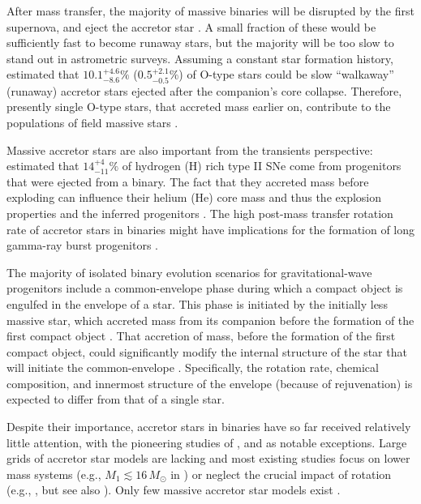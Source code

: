 \documentclass[twocolumn,twocolappendix,trackchanges]{aastex63}
\begin{document}
After mass transfer, the majority of massive binaries will be
disrupted by the first supernova, and eject the accretor star \citep[``binary SN
scenario'', ][]{blaauw:61, dedonder:97, eldridge:11, boubert:18,
  renzo:19walk, evans:20}.  A small fraction of these would be
sufficiently fast to become runaway stars, but the majority will be
too slow to stand out in astrometric surveys. Assuming a constant star
formation history, \cite{renzo:19walk} estimated that
$10.1^{+4.6}_{-8.6}\%$ ($0.5^{+2.1}_{-0.5}\%$) of O-type stars could
be slow ``walkaway'' (runaway) accretor stars ejected after the companion's
core collapse. Therefore, presently single O-type stars, that accreted
mass earlier on, contribute to the populations of field massive stars \citep[e.g.,][]{dorigo-jones:20}.

Massive accretor stars are also
important from the transients perspective: \cite{zapartas:19} estimated that $14_{-11}^{+4}\%$ of
hydrogen (H) rich
type II SNe come from progenitors that were ejected from a binary. The fact that they accreted mass before exploding can
influence their helium (He) core mass and thus the explosion
properties and the inferred progenitors \citep{zapartas:21}. %
The high post-mass transfer rotation
rate of accretor stars in binaries might have implications for the
formation of long gamma-ray burst progenitors \citep[e.g.,][]{cantiello:07}.

The majority of isolated binary evolution scenarios for
gravitational-wave progenitors include a common-envelope
phase during which a compact object is engulfed in the envelope of a star. This phase is initiated by the initially less massive star, which
accreted mass from its companion before the formation of the first compact object
\citep[e.g.,][]{belczynski:16nat, tauris:17,
  broekgaarden:21}. That accretion of mass,
before the formation of the first compact object, could significantly modify the
internal structure of the star that will initiate the common-envelope
\citep[e.g.,][]{law-smith:20, klencki:21}. Specifically, the
rotation rate, chemical composition, and innermost structure of the
envelope (because of rejuvenation) is expected to differ from that of a single star.

Despite their importance, accretor stars in binaries have so far
received relatively little attention, with the pioneering
studies of \cite{ulrich:76, hellings:83, hellings:84}, and
\cite{braun:95} as notable exceptions. Large grids of accretor star models
are lacking and most existing studies focus on lower mass systems
(e.g., $M_1\lesssim 16\,M_\odot$ in \citealt{vanrensbergen:11}) or
neglect the crucial impact of rotation (e.g., \citealt{sravan:19}, but see also
\citealt{wang:20}). Only few massive accretor star models exist
\citep[e.g.,][]{petrovic:05, cantiello:07}.
\end{document}
